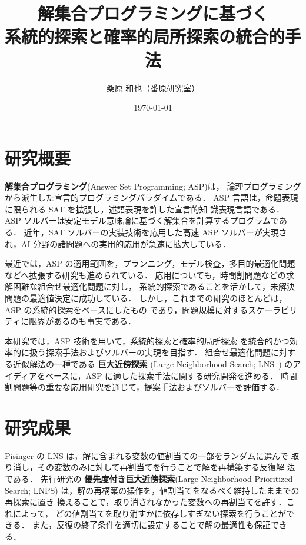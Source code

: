 \documentclass[a4j,10pt]{jarticle}
\title{解集合プログラミングに基づく\\系統的探索と確率的局所探索の統合的手法}
\author{桑原 和也（番原研究室）}
\date{\today}
\begin{document}
\maketitle
\thispagestyle{empty}
\begin{multicols}{1}

\section{研究概要}
\textbf{解集合プログラミング}(Answer Set Programming; ASP)は，
論理プログラミングから派生した宣言的プログラミングパラダイムである．
ASP 言語は，命題表現に限られる SAT を拡張し，述語表現を許した宣言的知
識表現言語である．
ASP ソルバーは安定モデル意味論に基づく解集合を計算するプログラムである．
近年，SAT ソルバーの実装技術を応用した高速 ASP ソルバーが実現され，AI
分野の諸問題への実用的応用が急速に拡大している．

最近では，ASP の適用範囲を，プランニング，モデル検査，多目的最適化問題
などへ拡張する研究も進められている．
応用についても，時間割問題などの求解困難な組合せ最適化問題に対し，
系統的探索であることを活かして，未解決問題の最適値決定に成功している．
しかし，これまでの研究のほとんどは，ASP の系統的探索をベースにしたもの
であり，問題規模に対するスケーラビリティに限界があるのも事実である．

本研究では，ASP 技術を用いて，系統的探索と確率的局所探索
を統合的かつ効率的に扱う探索手法およびソルバーの実現を目指す．
組合せ最適化問題に対する近似解法の一種である
\textbf{巨大近傍探索} (Large Neighborhood Search; LNS~\cite{Psinger_10})
のアイディアをベースに，ASP に適した探索手法に関する研究開発を進める．
時間割問題等の重要な応用研究を通じて，提案手法およびソルバーを評価する．

\section{研究成果}
Pisinger の LNS は，解に含まれる変数の値割当ての一部をランダムに選んで
取り消し，その変数のみに対して再割当てを行うことで解を再構築する反復解
法である．
先行研究の
\textbf{優先度付き巨大近傍探索}(Large Neighborhood Prioritized Search; LNPS)
は，解の再構築の操作を，値割当てをなるべく維持したままでの再探索に置き
換えることで，取り消されなかった変数への再割当てを許す．これによって，
どの値割当てを取り消すかに依存しすぎない探索を行うことができる．
また，反復の終了条件を適切に設定することで解の最適性も保証できる．


\end{multicols}
\end{document}
